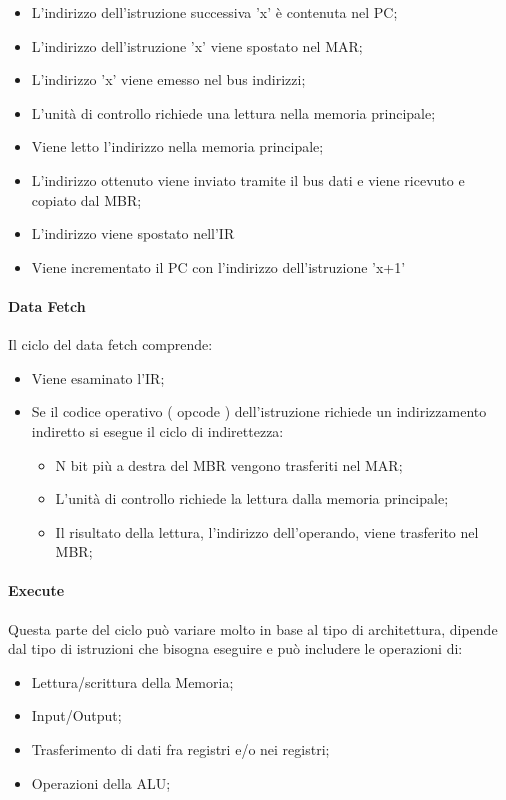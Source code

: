 \documentclass[arch.tex]{subfiles}
\begin{document}
\begin{itemize}
	\item L'indirizzo dell'istruzione successiva 'x' è contenuta nel PC;
	\item L'indirizzo dell'istruzione 'x' viene spostato nel MAR;
	\item L'indirizzo 'x' viene emesso nel bus indirizzi;
	\item L'unità di controllo richiede una lettura nella memoria principale;
	\item Viene letto l'indirizzo nella memoria principale;
	\item L'indirizzo ottenuto viene inviato tramite il bus dati e viene 
		ricevuto e copiato dal MBR;
	\item L'indirizzo viene spostato nell'IR
	\item Viene incrementato il PC con l'indirizzo dell'istruzione 'x+1'
\end{itemize}


\paragraph{Data Fetch}%
\label{par:data_fetch}
Il ciclo del data fetch comprende:

\begin{itemize}
	\item Viene esaminato l'IR;
	\item Se il codice operativo ( opcode ) dell'istruzione richiede un indirizzamento indiretto
		si esegue il ciclo di indirettezza:
		\begin{itemize}
			\item N bit più a destra del MBR vengono trasferiti nel MAR;
			\item L'unità di controllo richiede la lettura dalla memoria principale;
			\item Il risultato della lettura, l'indirizzo dell'operando, viene trasferito
				nel MBR;
		\end{itemize}
\end{itemize}

\paragraph{Execute}%
\label{par:execute}
Questa parte del ciclo può variare molto in base al tipo di architettura, dipende dal tipo 
di istruzioni che bisogna eseguire e può includere le operazioni di:

\begin{itemize}
	\item Lettura/scrittura della Memoria;
	\item Input/Output;
	\item Trasferimento di dati fra registri e/o nei registri;
	\item Operazioni della ALU;
\end{itemize}
\end{document}
